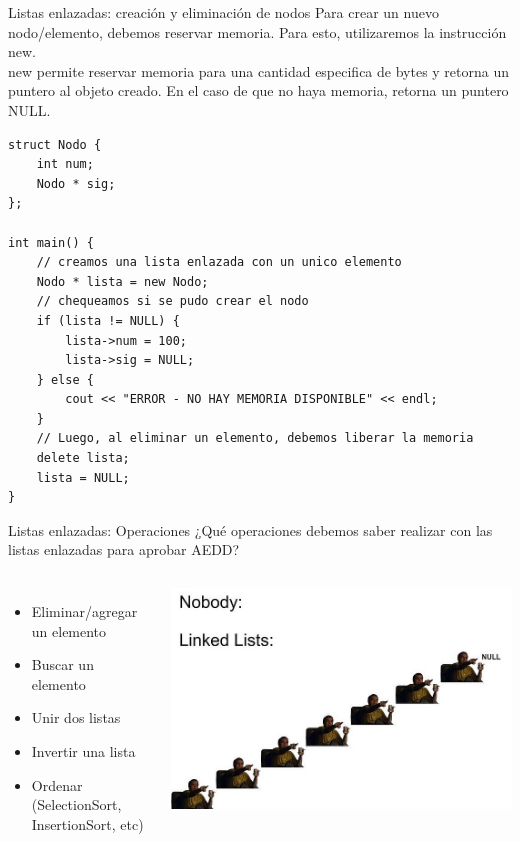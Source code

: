 \documentclass[12pt]{beamer}
\begin{document}
\begin{frame}[fragile]{Listas enlazadas: creación y eliminación de nodos}
    Para crear un nuevo nodo/elemento, debemos reservar memoria. Para esto, utilizaremos la instrucción \alert{new}. \\
    \medskip
    \alert{new} permite reservar memoria para una cantidad especifica de bytes y retorna un puntero al objeto creado. En el caso de que no haya memoria, retorna un puntero NULL. \\
    \medskip
\begin{lstlisting}[basicstyle=\tiny]
struct Nodo {
    int num;
    Nodo * sig;
};

int main() {
    // creamos una lista enlazada con un unico elemento
    Nodo * lista = new Nodo;
    // chequeamos si se pudo crear el nodo
    if (lista != NULL) {
        lista->num = 100;
        lista->sig = NULL;
    } else {
        cout << "ERROR - NO HAY MEMORIA DISPONIBLE" << endl;
    }
    // Luego, al eliminar un elemento, debemos liberar la memoria
    delete lista;
    lista = NULL;
}
\end{lstlisting}
\end{frame}

\begin{frame}{Listas enlazadas: Operaciones}
    ¿Qué operaciones debemos saber realizar con las listas enlazadas para aprobar AEDD?
    \begin{columns}
        \begin{itemize}
            \item Eliminar/agregar un elemento
            \item Buscar un elemento
            \item Unir dos listas
            \item Invertir una lista
            \item Ordenar (SelectionSort, InsertionSort, etc)
        \end{itemize}
        \includegraphics[width=\textwidth]{linked_meme.jpg}
    \end{columns}
\end{frame}
\end{document}
